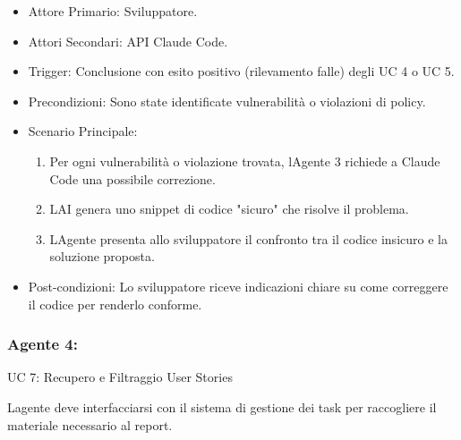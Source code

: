 \documentclass[12pt, a4paper]{article}
\begin{document}
\begin{itemize}
\item
  Attore Primario: Sviluppatore.
\item
  Attori Secondari: API Claude Code.
\item
  Trigger: Conclusione con esito positivo (rilevamento falle) degli UC 4
  o UC 5.
\item
  Precondizioni: Sono state identificate vulnerabilità o violazioni di
  policy.
\item
  Scenario Principale:

  \begin{enumerate}
  \def\labelenumi{\arabic{enumi}.}
  \item
    Per ogni vulnerabilità o violazione trovata,
    l\textquotesingle Agente 3 richiede a Claude Code una possibile
    correzione.
  \item
    L\textquotesingle AI genera uno snippet di codice "sicuro" che
    risolve il problema.
  \item
    L\textquotesingle Agente presenta allo sviluppatore il confronto tra
    il codice insicuro e la soluzione proposta.
  \end{enumerate}
\item
  Post-condizioni: Lo sviluppatore riceve indicazioni chiare su come
  correggere il codice per renderlo conforme.
\end{itemize}

\subsubsection{\texorpdfstring{Agente 4: }{Agente 4: }}\label{agente-4}

UC 7: Recupero e Filtraggio User Stories

L\textquotesingle agente deve interfacciarsi con il sistema di gestione
dei task per raccogliere il materiale necessario al report.
\end{document}
